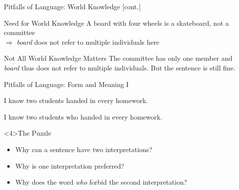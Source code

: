 \documentclass[xcolor={usenames,svgnames,x11names,dvipsnames,table}]{beamer}
\begin{document}
\begin{frame}{Pitfalls of Language: World Knowledge [cont.]}
    \begin{exe}
        \small
        \ex
        \begin{xlist}
        \end{xlist}
    \end{exe}
    \pause
    \begin{block}{Need for World Knowledge}
        A board with four wheels is a skateboard, not a committee\\
        $\Rightarrow$ \emph{board} does not refer to multiple individuals here
    \end{block}

    \pause
    \begin{exe}
        \small
    \end{exe}
        \pause
    \begin{block}{Not All World Knowledge Matters}
        The committee has only one member and \emph{board} thus does not refer to multiple individuals.
        But the sentence is still fine.
    \end{block}
\end{frame}

\begin{frame}{Pitfalls of Language: Form and Meaning I}
    \begin{exe}
        \small
        \ex I know two students handed in every homework.
    \end{exe}

    \begin{exe}
        \small
        \ex I know two students who handed in every homework.
    \end{exe}

    \bigskip
    \begin{block}<4>{The Puzzle}
        \begin{itemize}
            \item Why can a sentence have two interpretations?
             \item Why is one interpretation preferred?
            \item Why does the word \emph{who} forbid the second interpretation?
        \end{itemize}
    \end{block}
\end{frame}
\end{document}
